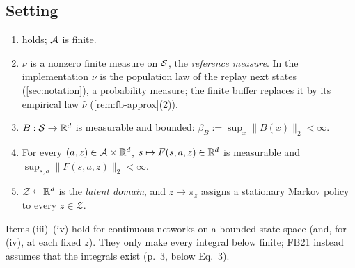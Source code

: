 \providecommand{\Bb}{\mathcal B_b}
\providecommand{\gr}{\mathrm{gr}}

\subsection{Setting}\label{sec:fb-setting}

\begin{assumption}[A-FB]\label{ass:fb}
\leavevmode
\begin{enumerate}[nosep,label=(\roman*)]
\item {} holds; $\mathcal{A}$ is finite.
\item $\nu$ is a nonzero finite measure on $\mathcal{S}$, the \emph{reference measure}.
  In the implementation $\nu$ is the population law of the replay next states (\cref{sec:notation}), a probability measure; the finite buffer replaces it by its empirical law $\hat\nu$ (\cref{rem:fb-approx}(2)).
\item $B:\mathcal{S}\to\mathbb{R}^d$ is measurable and bounded: $\beta_B:=\sup_x\|B(x)\|_2<\infty$.
\item For every $(a,z)\in\mathcal{A}\times\mathbb{R}^d$, $s\mapsto F(s,a,z)\in\mathbb{R}^d$ is measurable and $\sup_{s,a}\|F(s,a,z)\|_2<\infty$.
\item $\mathcal Z\subseteq\mathbb{R}^d$ is the \emph{latent domain}, and $z\mapsto\pi_z$ assigns a stationary Markov policy to every $z\in\mathcal Z$.
\end{enumerate}
\end{assumption}
Items (iii)--(iv) hold for continuous networks on a bounded state space (and, for (iv), at each fixed $z$). They only make every integral below finite; FB21 instead assumes that the integrals exist (p.~3, below Eq.~3).


